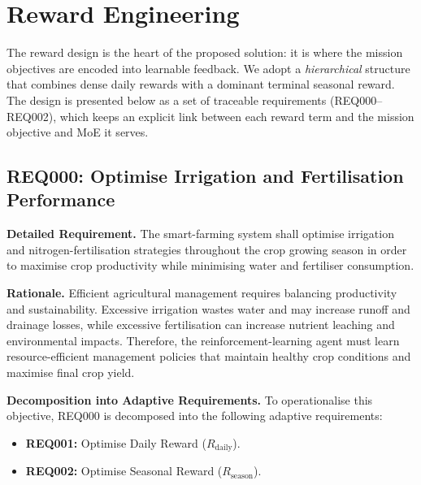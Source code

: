 \section{Reward Engineering}
\label{sec:reward}

The reward design is the heart of the proposed solution: it is where the mission
objectives are encoded into learnable feedback. We adopt a \emph{hierarchical}
structure that combines dense daily rewards with a dominant terminal seasonal
reward. The design is presented below as a set of traceable requirements
(REQ000--REQ002), which keeps an explicit link between each reward term and the
mission objective and MoE it serves.

\subsection{REQ000: Optimise Irrigation and Fertilisation Performance}

\noindent\textbf{Detailed Requirement.}
The smart-farming system shall optimise irrigation and nitrogen-fertilisation strategies
throughout the crop growing season in order to maximise crop productivity while
minimising water and fertiliser consumption.

\vspace{0.2cm}
\noindent\textbf{Rationale.}
Efficient agricultural management requires balancing productivity and sustainability.
Excessive irrigation wastes water and may increase runoff and drainage losses, while
excessive fertilisation can increase nutrient leaching and environmental impacts.
Therefore, the reinforcement-learning agent must learn resource-efficient management
policies that maintain healthy crop conditions and maximise final crop yield.

\vspace{0.2cm}
\noindent\textbf{Decomposition into Adaptive Requirements.}
To operationalise this objective, REQ000 is decomposed into the following adaptive
requirements:
\begin{itemize}
    \item \textbf{REQ001:} Optimise Daily Reward ($R_{\text{daily}}$).
    \item \textbf{REQ002:} Optimise Seasonal Reward ($R_{\text{season}}$).
\end{itemize}


